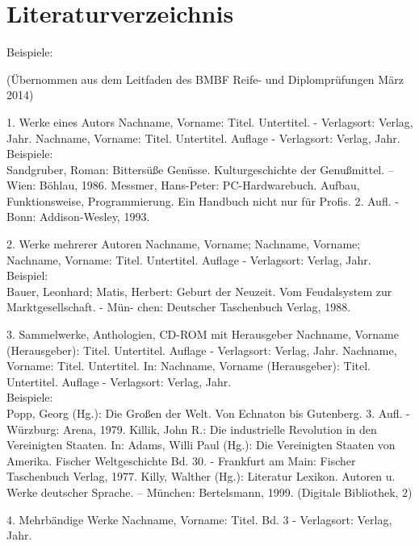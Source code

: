 \documentclass[12pt,a4paper]{article}
\newcommand{\yhbu}[0]{\color{ydkbu}}	%
\begin{document}
{\section{\sc Literaturverzeichnis}
	{\yhbu
	Beispiele:
	\\[0mm]{\fontsize{10pt}{10pt}\selectfont
	(Übernommen aus dem Leitfaden des BMBF Reife- und Diplomprüfungen März 2014)
	\\[0mm]
	\begin{description*}
	\item[1. Werke eines Autors] Nachname, Vorname: Titel. Untertitel. -
		Verlagsort: Verlag, Jahr. Nachname,
		Vorname: Titel. Untertitel. Auflage - Verlagsort: Verlag, Jahr.
		\\[1mm]Beispiele:
		\\Sandgruber, Roman: Bittersüße Genüsse. Kulturgeschichte der Genußmittel. – Wien:
		Böhlau, 1986. Messmer, Hans-Peter: PC-Hardwarebuch. Aufbau, Funktionsweise,
		Programmierung. Ein Handbuch nicht nur für Profis. 2. Aufl. - Bonn: Addison-Wesley,
		1993.
		\vspace*{2mm}
	\item[2. Werke mehrerer Autoren] Nachname, Vorname; Nachname, Vorname; Nachname, Vorname: Titel.
		Untertitel. Auflage - Verlagsort: Verlag, Jahr.
		\\[1mm]Beispiel:
		\\Bauer, Leonhard; Matis, Herbert: Geburt der Neuzeit. Vom Feudalsystem zur
		Marktgesellschaft. - Mün- chen: Deutscher Taschenbuch Verlag, 1988.
		\vspace*{2mm}
	\item[3. Sammelwerke, Anthologien, CD-ROM mit Herausgeber] Nachname, Vorname (Herausgeber):
		Titel. Untertitel. Auflage - Verlagsort: Verlag, Jahr. Nachname, Vorname: Titel.
		Untertitel. In: Nachname, Vorname (Herausgeber): Titel. Untertitel. Auflage -
		Verlagsort: Verlag, Jahr.
		\\[1mm]Beispiele:
		\\Popp, Georg (Hg.): Die Großen der Welt. Von Echnaton bis Gutenberg. 3. Aufl. -
		Würzburg: Arena, 1979. Killik, John R.: Die industrielle Revolution in den Vereinigten
		Staaten. In: Adams, Willi Paul (Hg.): Die Vereinigten Staaten von Amerika. Fischer
		Weltgeschichte Bd. 30. - Frankfurt am Main: Fischer Taschenbuch Verlag, 1977. Killy,
		Walther (Hg.): Literatur Lexikon. Autoren u. Werke deutscher Sprache. – München:
		Bertelsmann, 1999. (Digitale Bibliothek, 2)
		\vspace*{2mm}
	\item[4. Mehrbändige Werke] Nachname, Vorname: Titel. Bd. 3 - Verlagsort: Verlag, Jahr.

\end{description*}}}}
\end{document}
